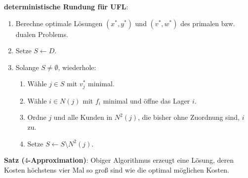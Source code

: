 \textbf{deterministische Rundung für UFL}:
\begin{enumerate}
    \item
    Berechne optimale Lösungen $(x^\ast, y^\ast)$ und
    $(v^\ast, w^\ast)$ des primalen bzw. dualen Problems.

    \item
    Setze $S \leftarrow D$.

    \item
    Solange $S \not= \emptyset$, wiederhole:
    \begin{enumerate}
        \item
        Wähle $j \in S$ mit $v_j^\ast$ minimal.

        \item
        Wähle $i \in N(j)$ mit $f_i$ minimal und öffne das Lager $i$.

        \item
        Ordne $j$ und alle Kunden in $N^2(j)$, die bisher ohne Zuordnung sind, $i$ zu.

        \item
        Setze $S \leftarrow S \setminus N^2(j)$.
    \end{enumerate}
\end{enumerate}

\linie

\textbf{Satz ($4$-Approximation)}:
Obiger Algorithmus erzeugt eine Lösung, deren Kosten höchstens
vier Mal so groß sind wie die optimal möglichen Kosten.


